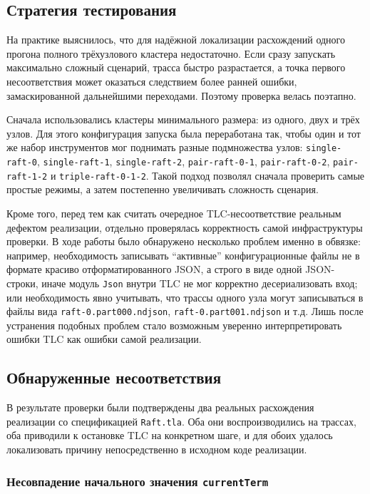 \subsection{Стратегия тестирования}

На практике выяснилось, что для надёжной локализации расхождений одного
прогона полного трёхузлового кластера недостаточно. Если сразу запускать
максимально сложный сценарий, трасса быстро разрастается, а точка первого
несоответствия может оказаться следствием более ранней ошибки, замаскированной
дальнейшими переходами. Поэтому проверка велась поэтапно.

Сначала использовались кластеры минимального размера: из одного, двух и трёх
узлов. Для этого конфигурация запуска была переработана так, чтобы один и тот
же набор инструментов мог поднимать разные подмножества узлов:
\texttt{single-raft-0}, \texttt{single-raft-1}, \texttt{single-raft-2},
\texttt{pair-raft-0-1}, \texttt{pair-raft-0-2}, \texttt{pair-raft-1-2} и
\texttt{triple-raft-0-1-2}. Такой подход позволял сначала проверить самые
простые режимы, а затем постепенно увеличивать сложность сценария.

Кроме того, перед тем как считать очередное TLC-несоответствие реальным
дефектом реализации, отдельно проверялась корректность самой инфраструктуры
проверки. В ходе работы было обнаружено несколько проблем именно в обвязке:
например, необходимость записывать ``активные'' конфигурационные файлы не в
формате красиво отформатированного JSON, а строго в виде одной JSON-строки,
иначе модуль \texttt{Json} внутри TLC не мог корректно десериализовать вход; или
необходимость явно учитывать, что трассы одного узла могут записываться в
файлы вида \texttt{raft-0.part000.ndjson}, \texttt{raft-0.part001.ndjson} и
т.д. Лишь после устранения подобных проблем стало возможным уверенно
интерпретировать ошибки TLC как ошибки самой реализации.

\subsection{Обнаруженные несоответствия}

В результате проверки были подтверждены два реальных расхождения реализации со
спецификацией \texttt{Raft.tla}. Оба они воспроизводились на трассах, оба
приводили к остановке TLC на конкретном шаге, и для обоих удалось локализовать
причину непосредственно в исходном коде реализации.

\subsubsection*{Несовпадение начального значения \texttt{currentTerm}}

